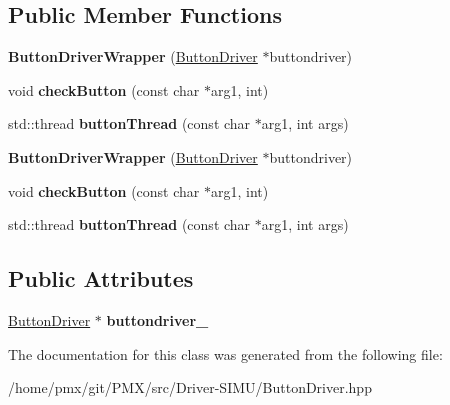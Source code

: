 \subsection*{Public Member Functions}
\begin{DoxyCompactItemize}
\item 
\mbox{\label{classButtonDriverWrapper_aa22e07d6b1010a2439de02d3a7f976aa}} 
{\bfseries Button\+Driver\+Wrapper} (\hyperlink{classButtonDriver}{Button\+Driver} $\ast$buttondriver)
\item 
\mbox{\label{classButtonDriverWrapper_a76a81c5192ed24d5ad99e8c4ffad81b5}} 
void {\bfseries check\+Button} (const char $\ast$arg1, int)
\item 
\mbox{\label{classButtonDriverWrapper_a86cd30a961616fb443fccfd1acaba0f7}} 
std\+::thread {\bfseries button\+Thread} (const char $\ast$arg1, int args)
\item 
\mbox{\label{classButtonDriverWrapper_aa22e07d6b1010a2439de02d3a7f976aa}} 
{\bfseries Button\+Driver\+Wrapper} (\hyperlink{classButtonDriver}{Button\+Driver} $\ast$buttondriver)
\item 
\mbox{\label{classButtonDriverWrapper_a76a81c5192ed24d5ad99e8c4ffad81b5}} 
void {\bfseries check\+Button} (const char $\ast$arg1, int)
\item 
\mbox{\label{classButtonDriverWrapper_a86cd30a961616fb443fccfd1acaba0f7}} 
std\+::thread {\bfseries button\+Thread} (const char $\ast$arg1, int args)
\end{DoxyCompactItemize}
\subsection*{Public Attributes}
\begin{DoxyCompactItemize}
\item 
\mbox{\label{classButtonDriverWrapper_acd78da6d7847ef5764da7082576f65da}} 
\hyperlink{classButtonDriver}{Button\+Driver} $\ast$ {\bfseries buttondriver\+\_\+}
\end{DoxyCompactItemize}


The documentation for this class was generated from the following file\+:\begin{DoxyCompactItemize}
\item 
/home/pmx/git/\+P\+M\+X/src/\+Driver-\/\+S\+I\+M\+U/Button\+Driver.\+hpp\end{DoxyCompactItemize}
